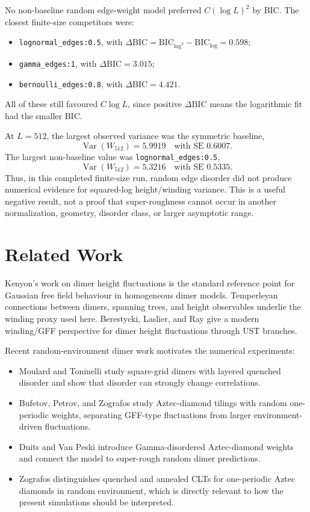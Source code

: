 \documentclass[11pt]{article}
\begin{document}
No non-baseline random edge-weight model preferred \(C(\log L)^2\) by BIC.
The closest finite-size competitors were:
\begin{itemize}[leftmargin=1.5em]
  \item \texttt{lognormal\_edges:0.5}, with
        \(\Delta\mathrm{BIC}=\mathrm{BIC}_{\log^2}-\mathrm{BIC}_{\log}=0.598\);
  \item \texttt{gamma\_edges:1}, with
        \(\Delta\mathrm{BIC}=3.015\);
  \item \texttt{bernoulli\_edges:0.8}, with
        \(\Delta\mathrm{BIC}=4.421\).
\end{itemize}
All of these still favoured \(C\log L\), since positive \(\Delta\mathrm{BIC}\)
means the logarithmic fit had the smaller BIC.

At \(L=512\), the largest observed variance was the symmetric baseline,
\[
  \operatorname{Var}(W_{512})=5.9919 \quad \text{with SE }0.6007.
\]
The largest non-baseline value was \texttt{lognormal\_edges:0.5},
\[
  \operatorname{Var}(W_{512})=5.3216 \quad \text{with SE }0.5335.
\]
Thus, in this completed finite-size run, random edge disorder did not produce
numerical evidence for squared-log height/winding variance.  This is a useful
negative result, not a proof that super-roughness cannot occur in another
normalization, geometry, disorder class, or larger asymptotic range.

\section{Related Work}

Kenyon's work on dimer height fluctuations is the standard reference point for
Gaussian free field behaviour in homogeneous dimer models.  Temperleyan
connections between dimers, spanning trees, and height observables underlie the
winding proxy used here.  Berestycki, Laslier, and Ray give a modern
winding/GFF perspective for dimer height fluctuations through UST branches.

Recent random-environment dimer work motivates the numerical experiments:
\begin{itemize}[leftmargin=1.5em]
  \item Moulard and Toninelli study square-grid dimers with layered quenched
        disorder and show that disorder can strongly change correlations.
  \item Bufetov, Petrov, and Zografos study Aztec-diamond tilings with random
        one-periodic weights, separating GFF-type fluctuations from larger
        environment-driven fluctuations.
  \item Duits and Van Peski introduce Gamma-disordered Aztec-diamond weights and
        connect the model to super-rough random dimer predictions.
  \item Zografos distinguishes quenched and annealed CLTs for one-periodic
        Aztec diamonds in random environment, which is directly relevant to
        how the present simulations should be interpreted.
\end{itemize}
\end{document}
